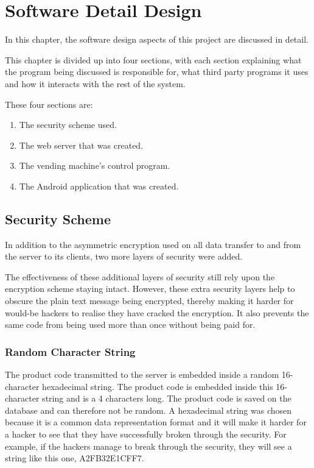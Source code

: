 \chapter{Software Detail Design}
\label{chap:4}

In this chapter, the software design aspects of this project are discussed in
detail.

This chapter is divided up into four sections, with each section explaining what
the program being discussed is responsible for, what third party programs it
uses and how it interacts with the rest of the system. 

These four sections are:

\begin{enumerate}
 
  \item The security scheme used.
  \item The web server that was created.
  \item The vending machine's control program.
  \item The Android application that was created.
  
\end{enumerate}

\section{Security Scheme}
\label{sec:security-code-scheme}

In addition to the asymmetric encryption used on all data transfer to and from
the server to its clients, two more layers of security were added. 

The effectiveness of these additional layers of security still rely upon the
encryption scheme staying intact. However, these extra security layers help to
obscure the plain text message being encrypted, thereby making it harder for
would-be hackers to realise they have cracked the encryption. It also prevents
the same code from being used more than once without being paid for. 

\subsection{Random Character String}

The product code transmitted to the server is embedded inside a
random 16-character hexadecimal string. The product code is embedded inside this
16-character string and is a 4 characters long. The product code is saved on the
database and can therefore not be random. 
A hexadecimal string was chosen because it is a common data representation
format and it will make it harder for a hacker to see that they have
successfully broken through the security. For example, if the hackers manage to
break through the security, they will see a string like this one, A2FB32E1CFF7.

